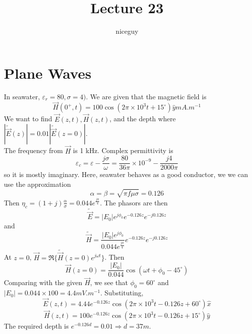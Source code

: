 \documentclass[12pt]{article}
\title{Lecture 23}
\author{niceguy}
\begin{document}
\maketitle

\section{Plane Waves}

\begin{ex}[Seawater]
    In seawater, $\varepsilon_r = 80, \sigma = 4)$. We are given that the magnetic field is
    $$\vec H(0^+,t) = 100\cos(2\pi\times10^3t + 15^\circ)\hat y\unit{mA.m^{-1}}$$
    We want to find $\vec E(z,t), \vec H(z,t)$, and the depth where $|\tilde{\vec E}(z)| = 0.01 |\tilde{\vec E}(z=0)|$. \\
    The frequency from $\vec H$ is 1 kHz. Complex permittivity is
    $$\varepsilon_c = \varepsilon - \frac{j\sigma}{\omega} = \frac{80}{36\pi} \times 10^{-9} - \frac{j4}{2000\pi}$$
    so it is mostly imaginary. Here, seawater behaves as a good conductor, we we can use the approximation
    $$\alpha = \beta = \sqrt{\pi f\mu\sigma} = 0.126$$
    Then $\eta_c = (1+j)\frac{\alpha}{\sigma} = 0.044e^{\frac{j\pi}{4}}$. The phasors are then
    $$\tilde{\vec E} = |E_0|e^{j\phi_0}e^{-0.126z}e^{-j0.126z}$$
    and
    $$\tilde{\vec H} = \frac{|E_0|e^{j\phi_0}}{0.044e^{\frac{j\pi}{4}}}e^{-0.126z}e^{-j0.126z}$$
    At $z = 0$, $\vec H = \Re\{\tilde{\vec{H}}(z=0)e^{j\omega t}\}$. Then
    $$\vec H(z=0) = \frac{|E_0|}{0.044}\cos(\omega t + \phi_0 - 45^\circ)$$
    Comparing with the given $\vec H$, we see that $\phi_0 = 60^\circ$ and $|E_0| = 0.044 \times 100 = 4.4\unit{mV.m^{-1}}$. Substituting,
    $$\vec E(z,t) = 4.44e^{-0.126z}\cos(2\pi\times10^3t - 0.126z + 60^\circ)\hat x$$
    $$\vec H(z,t) = 100e^{-0.126z}\cos(2\pi\times10^3t - 0.126z + 15^\circ)\hat y$$
    The required depth is $e^{-0.126d} = 0.01 \Rightarrow d = 37\unit{m}$.
\end{ex}
\end{document}
